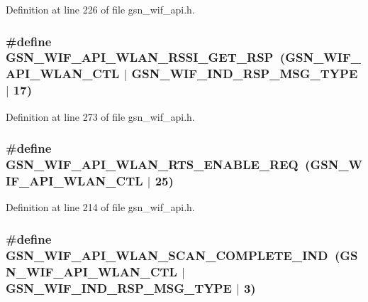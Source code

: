 Definition at line 226 of file gsn\_\-wif\_\-api.h.

\hypertarget{a00606_a269e0a872acf675df2554005aed594c3}{
\subsubsection[{GSN\_\-WIF\_\-API\_\-WLAN\_\-RSSI\_\-GET\_\-RSP}]{\setlength{\rightskip}{0pt plus 5cm}\#define GSN\_\-WIF\_\-API\_\-WLAN\_\-RSSI\_\-GET\_\-RSP~(GSN\_\-WIF\_\-API\_\-WLAN\_\-CTL $|$ GSN\_\-WIF\_\-IND\_\-RSP\_\-MSG\_\-TYPE $|$ 17)}}
\label{a00606_a269e0a872acf675df2554005aed594c3}


Definition at line 273 of file gsn\_\-wif\_\-api.h.

\hypertarget{a00606_a99d545c6a379d1d68302b795ea877018}{
\subsubsection[{GSN\_\-WIF\_\-API\_\-WLAN\_\-RTS\_\-ENABLE\_\-REQ}]{\setlength{\rightskip}{0pt plus 5cm}\#define GSN\_\-WIF\_\-API\_\-WLAN\_\-RTS\_\-ENABLE\_\-REQ~(GSN\_\-WIF\_\-API\_\-WLAN\_\-CTL $|$ 25)}}
\label{a00606_a99d545c6a379d1d68302b795ea877018}


Definition at line 214 of file gsn\_\-wif\_\-api.h.

\hypertarget{a00606_a3257f30439daa60e3cbfcebd93b4fcc9}{
\subsubsection[{GSN\_\-WIF\_\-API\_\-WLAN\_\-SCAN\_\-COMPLETE\_\-IND}]{\setlength{\rightskip}{0pt plus 5cm}\#define GSN\_\-WIF\_\-API\_\-WLAN\_\-SCAN\_\-COMPLETE\_\-IND~(GSN\_\-WIF\_\-API\_\-WLAN\_\-CTL $|$ GSN\_\-WIF\_\-IND\_\-RSP\_\-MSG\_\-TYPE $|$ 3)}}
\label{a00606_a3257f30439daa60e3cbfcebd93b4fcc9}


